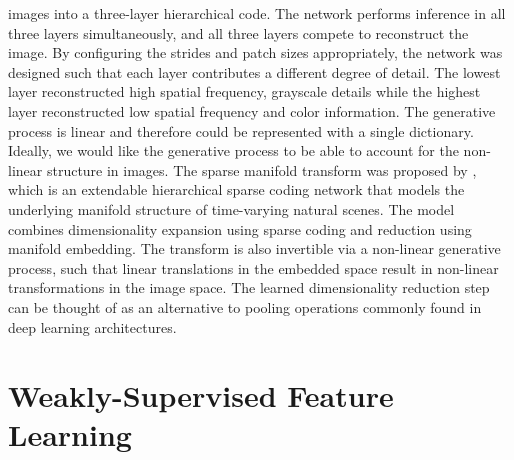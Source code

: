 images into a three-layer hierarchical code. The network performs inference in all three layers simultaneously, and all three layers compete to reconstruct the image. By configuring the strides and patch sizes appropriately, the network was designed such that each layer contributes a different degree of detail. The lowest layer reconstructed high spatial frequency, grayscale details while the highest layer reconstructed low spatial frequency and color information. The generative process is linear and therefore could be represented with a single dictionary. Ideally, we would like the generative process to be able to account for the non-linear structure in images. The sparse manifold transform was proposed by \parencite{chen2018sparse}, which is an extendable hierarchical sparse coding network that models the underlying manifold structure of time-varying natural scenes. The model combines dimensionality expansion using sparse coding and reduction using manifold embedding. The transform is also invertible via a non-linear generative process, such that linear translations in the embedded space result in non-linear transformations in the image space. The learned dimensionality reduction step can be thought of as an alternative to pooling operations commonly found in deep learning architectures.



\section{Weakly-Supervised Feature Learning}\label{sec:ch3_weak_supervised_learning}

